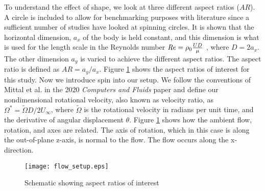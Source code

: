 To understand the effect of shape, we look at three different aspect ratios ($AR$). A circle is included to allow for benchmarking purposes with literature since a sufficient number of studies have looked at spinning circles. It is shown that the horizontal dimension, $a_x$ of the body is held constant, and this dimension is what is used for the length scale in the Reynolds number $\mathit{Re} = \rho_0 \frac{U D}{\mu}$ , where $D = 2a_x$. The other dimension $a_y$ is varied to achieve the different aspect ratios. The aspect ratio is defined as $AR = a_y/a_x$. Figure \ref{fig:flow setup} shows the aspect ratios of interest for this study. 
Now we introduce spin into our setup. We follow the conventions of Mittal et al. in the 2020 \textit{Computers and Fluids} paper \cite{mittal_direct_2020} and define our nondimensional rotational velocity, also known as velocity ratio, as $\Omega^{\ast} = \tilde{\Omega}D/2 U_{\infty}$, where $\tilde{\Omega}$ is the rotational velocity in radians per unit time, and the derivative of angular displacement $\theta$. Figure \ref{fig:flow setup} shows how the ambient flow, rotation, and axes are related. The axis of rotation, which in this case is along the out-of-plane z-axis, is normal to the flow. The flow occurs along the x-direction. 
\begin{figure}
    \centerline{\texttt{[image: flow\_setup.eps]}}
    \caption{Schematic showing aspect ratios of interest}
    \label{fig:flow setup}
\end{figure}

